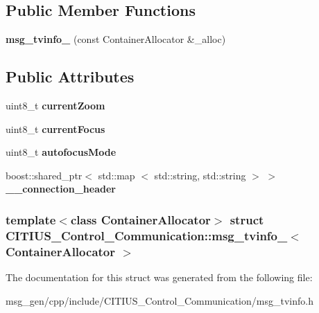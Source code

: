 \subsection*{\-Public \-Member \-Functions}
\begin{DoxyCompactItemize}
\item 
\hypertarget{struct_c_i_t_i_u_s___control___communication_1_1msg__tvinfo___a91aa7c0f54586b7c06d08d26fd694fcd}{{\bfseries msg\-\_\-tvinfo\-\_\-} (const \-Container\-Allocator \&\-\_\-alloc)}\label{struct_c_i_t_i_u_s___control___communication_1_1msg__tvinfo___a91aa7c0f54586b7c06d08d26fd694fcd}

\end{DoxyCompactItemize}
\subsection*{\-Public \-Attributes}
\begin{DoxyCompactItemize}
\item 
\hypertarget{struct_c_i_t_i_u_s___control___communication_1_1msg__tvinfo___a4346a24a1ed0555fe02c202f6fe14566}{uint8\-\_\-t {\bfseries current\-Zoom}}\label{struct_c_i_t_i_u_s___control___communication_1_1msg__tvinfo___a4346a24a1ed0555fe02c202f6fe14566}

\item 
\hypertarget{struct_c_i_t_i_u_s___control___communication_1_1msg__tvinfo___ab9fac5d0ec8c6e950715a895136ef3d8}{uint8\-\_\-t {\bfseries current\-Focus}}\label{struct_c_i_t_i_u_s___control___communication_1_1msg__tvinfo___ab9fac5d0ec8c6e950715a895136ef3d8}

\item 
\hypertarget{struct_c_i_t_i_u_s___control___communication_1_1msg__tvinfo___ac031f47f2f17f88b044c052be82f11a8}{uint8\-\_\-t {\bfseries autofocus\-Mode}}\label{struct_c_i_t_i_u_s___control___communication_1_1msg__tvinfo___ac031f47f2f17f88b044c052be82f11a8}

\item 
\hypertarget{struct_c_i_t_i_u_s___control___communication_1_1msg__tvinfo___a47f82c5cc9e31a7ba9bc03c9f168bd49}{boost\-::shared\-\_\-ptr$<$ std\-::map\*
$<$ std\-::string, std\-::string $>$ $>$ {\bfseries \-\_\-\-\_\-connection\-\_\-header}}\label{struct_c_i_t_i_u_s___control___communication_1_1msg__tvinfo___a47f82c5cc9e31a7ba9bc03c9f168bd49}

\end{DoxyCompactItemize}
\subsubsection*{template$<$class Container\-Allocator$>$ struct C\-I\-T\-I\-U\-S\-\_\-\-Control\-\_\-\-Communication\-::msg\-\_\-tvinfo\-\_\-$<$ Container\-Allocator $>$}



\-The documentation for this struct was generated from the following file\-:\begin{DoxyCompactItemize}
\item 
msg\-\_\-gen/cpp/include/\-C\-I\-T\-I\-U\-S\-\_\-\-Control\-\_\-\-Communication/msg\-\_\-tvinfo.\-h\end{DoxyCompactItemize}

